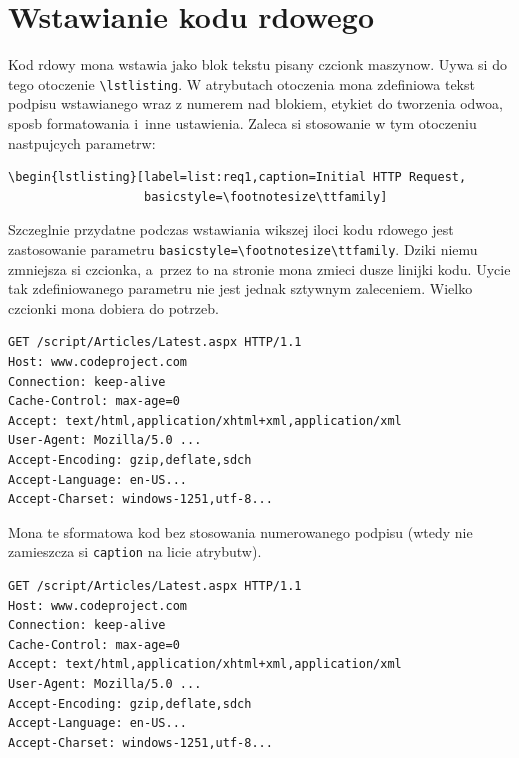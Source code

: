 \section{Wstawianie kodu rdowego}
Kod rdowy mona wstawia jako blok tekstu pisany czcionk maszynow. Uywa si do tego otoczenie \verb?\lstlisting?. W atrybutach otoczenia mona zdefiniowa tekst podpisu wstawianego wraz z numerem nad blokiem, etykiet do tworzenia odwoa, sposb formatowania i~inne ustawienia. Zaleca si stosowanie w tym otoczeniu nastpujcych parametrw:
\begin{lstlisting}[basicstyle=\footnotesize\ttfamily]
\begin{lstlisting}[label=list:req1,caption=Initial HTTP Request,
                   basicstyle=\footnotesize\ttfamily]
\end{lstlisting}
Szczeglnie przydatne podczas wstawiania wikszej iloci kodu rdowego jest zastosowanie parametru \verb+basicstyle=\footnotesize\ttfamily+. Dziki niemu zmniejsza si czcionka, a~przez to na stronie mona zmieci dusze linijki kodu. Uycie tak zdefiniowanego parametru nie jest jednak sztywnym zaleceniem. Wielko czcionki mona dobiera do potrzeb. 
{\belowcaptionskip=-10pt
\begin{lstlisting}[label=list:req1,caption=Initial HTTP Request,
                   basicstyle=\footnotesize\ttfamily]
GET /script/Articles/Latest.aspx HTTP/1.1
Host: www.codeproject.com
Connection: keep-alive
Cache-Control: max-age=0
Accept: text/html,application/xhtml+xml,application/xml
User-Agent: Mozilla/5.0 ...
Accept-Encoding: gzip,deflate,sdch
Accept-Language: en-US...
Accept-Charset: windows-1251,utf-8...
\end{lstlisting}
}
Mona te sformatowa kod bez stosowania numerowanego podpisu (wtedy nie zamieszcza si \texttt{caption} na licie atrybutw).
\begin{lstlisting}[basicstyle=\footnotesize\ttfamily]
GET /script/Articles/Latest.aspx HTTP/1.1
Host: www.codeproject.com
Connection: keep-alive
Cache-Control: max-age=0
Accept: text/html,application/xhtml+xml,application/xml
User-Agent: Mozilla/5.0 ...
Accept-Encoding: gzip,deflate,sdch
Accept-Language: en-US...
Accept-Charset: windows-1251,utf-8...
\end{lstlisting}


